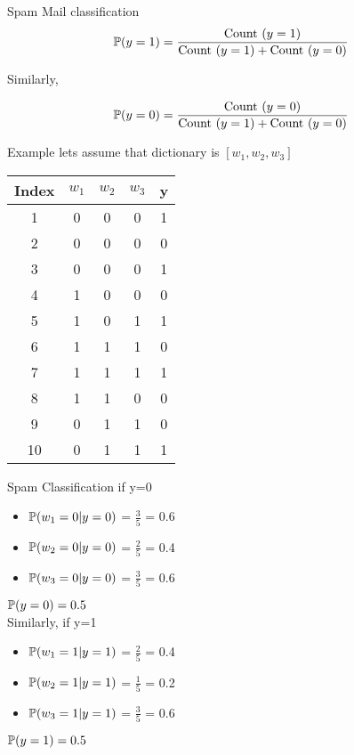\documentclass{beamer}
\begin{document}
\begin{frame}{Spam Mail classification}
    $$
        \mathbb{P}(y = 1) = \frac{\text{Count }(y=1) }{\text{Count }(y=1) +\text{Count }(y=0) }
    $$
    
    Similarly,
    
    $$
        \mathbb{P}(y = 0) = \frac{\text{Count }(y=0) }{\text{Count }(y=1) +\text{Count }(y=0) }
    $$
    
    
    
\end{frame}

\begin{frame}{Example}
    lets assume that dictionary is $[w_{1},w_{2},w_{3}]$
    
    
    \begin{tabular}{c|c|c|c|c}
    Index&$w_{1}$&$w_{2}$&$w_{3}$&y\\
    \hline
    \hline
         1 & 0 & 0 & 0 & 1  \\
         2 & 0 & 0 & 0 & 0  \\
         3 & 0 & 0 & 0 & 1  \\
         4 & 1 & 0 & 0 & 0  \\
         5 & 1 & 0 & 1 & 1  \\
         6 & 1 & 1 & 1 & 0  \\
         7 & 1 & 1 & 1 & 1  \\
         8 & 1 & 1 & 0 & 0  \\
         9 & 0 & 1 & 1 & 0  \\
         10 & 0 & 1 & 1 & 1  \\
    \end{tabular}
\end{frame}

\begin{frame}{Spam Classification}
    if y=0
    \begin{itemize}
        \item $\mathbb{P}(w_{1}=0\vert y=0)$ = $\frac{3}{5}$ = 0.6 \\
        \item $\mathbb{P}(w_{2}=0\vert y=0)$ = $\frac{2}{5}$ = 0.4 \\
        \item $\mathbb{P}(w_{3}=0\vert y=0)$ = $\frac{3}{5}$ = 0.6 \\
    \end{itemize}
    $\mathbb{P}(y=0) = 0.5$\\
    Similarly, if y=1
    \begin{itemize}
        \item $\mathbb{P}(w_{1}=1\vert y=1)$ = $\frac{2}{5}$ = 0.4 \\
        \item $\mathbb{P}(w_{2}=1\vert y=1)$ = $\frac{1}{5}$ = 0.2 \\
        \item $\mathbb{P}(w_{3}=1\vert y=1)$ = $\frac{3}{5}$ = 0.6 \\
    \end{itemize}
    $\mathbb{P}(y=1) = 0.5$
\end{frame}
\end{document}
